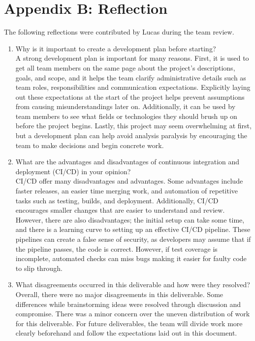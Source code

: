 \documentclass[11pt]{article}
\begin{document}
\section*{Appendix B: Reflection}
The following reflections were contributed by Lucas during the team review.
\begin{enumerate}
\item Why is it important to create a development plan before starting?
\\A strong development plan is important for many reasons. First, it is used to get all team members on the same
page about the project's descriptions, goals, and scope, and it helps the team clarify administrative details
such as team roles, responsibilities and communication expectations. Explicitly laying out these expectations at the start
of the project helps prevent assumptions from causing misunderstandings later on. Additionally, it can be used by
team members to see what fields or technologies they should brush up on before the project begins. Lastly, this project
may seem overwhelming at first, but a development plan can help avoid analysis paralysis by encouraging the team to make
decisions and begin concrete work.

\item What are the advantages and disadvantages of continuous integration and deployment (CI/CD) in your opinion?
\\CI/CD offer many disadvantages and advantages. Some advantages include faster releases, an easier time merging work,
and automation of repetitive tasks such as testing, builds, and deployment. Additionally, CI/CD encourages smaller changes
that are easier to understand and review. However, there are also disadvantages; the initial setup can take some time,
and there is a learning curve to setting up an effective CI/CD pipeline. These pipelines can create a false sense of security,
as developers may assume that if the pipeline passes, the code is correct. However, if test coverage is incomplete, automated
checks can miss bugs making it easier for faulty code to slip through.

\item What disagreements occurred in this deliverable and how were they resolved?
\\Overall, there were no major disagreements in this deliverable. Some differences while brainstorming ideas were
resolved through discussion and compromise. There was a minor concern over the uneven distribution of work for this deliverable.
For future deliverables, the team will divide work more clearly beforehand and follow the expectations laid out in this document.
\end{enumerate}
\end{document}
